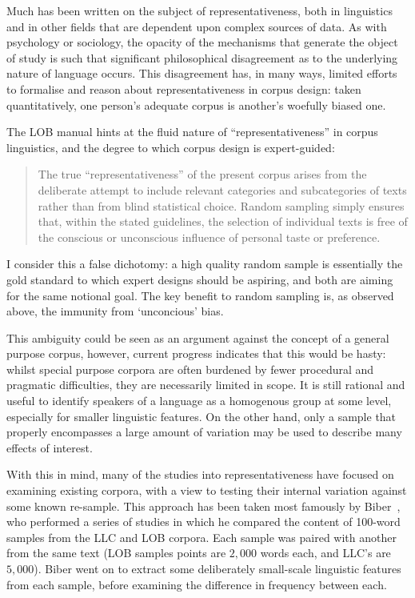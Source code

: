 Much has been written on the subject of representativeness\cite{biber1993using,varadi2001linguistic,varadi2000corpus,leech1992corpora,rapp2014using}, both in linguistics and in other fields that are dependent upon complex sources of data.  As with psychology or sociology, the opacity of the mechanisms that generate the object of study is such that significant philosophical disagreement as to the underlying nature of language occurs.  This disagreement has, in many ways, limited efforts to formalise and reason about representativeness in corpus design: taken quantitatively, one person's adequate corpus is another's woefully biased one.

The LOB manual hints at the fluid nature of ``representativeness'' in corpus linguistics, and the degree to which corpus design is expert-guided\cite{johansson1986tagged}:
\begin{quote}
The true “representativeness” of the present corpus arises from the deliberate attempt to include relevant categories and subcategories of texts rather than from blind statistical choice. Random sampling simply ensures that, within the stated guidelines, the selection of individual texts is free of the conscious or unconscious influence of personal taste or preference.
\end{quote}

I consider this a false dichotomy: a high quality random sample is essentially the gold standard to which expert designs should be aspiring, and both are aiming for the same notional goal.  The key benefit to random sampling is, as observed above, the immunity from `unconcious' bias\cite{barnett1991sample}. %

This ambiguity could be seen as an argument against the concept of a general purpose corpus, however, current progress indicates that this would be hasty: whilst special purpose corpora are often burdened by fewer procedural and pragmatic difficulties, they are necessarily limited in scope.  It is still rational and useful to identify speakers of a language as a homogenous group at some level, especially for smaller linguistic features.  On the other hand, only a sample that properly encompasses a large amount of variation may be used to describe many effects of interest.

With this in mind, many of the studies into representativeness have focused on examining existing corpora, with a view to testing their internal variation against some known re-sample.  This approach has been taken most famously by Biber~\cite{biber1993representativeness}, who performed a series of studies in which he compared the content of 100-word samples from the LLC and LOB corpora.  Each sample was paired with another from the same text (LOB samples points are $2,000$ words each, and LLC's are $5,000$).  Biber went on to extract some deliberately small-scale linguistic features from each sample, before examining the difference in frequency between each.


